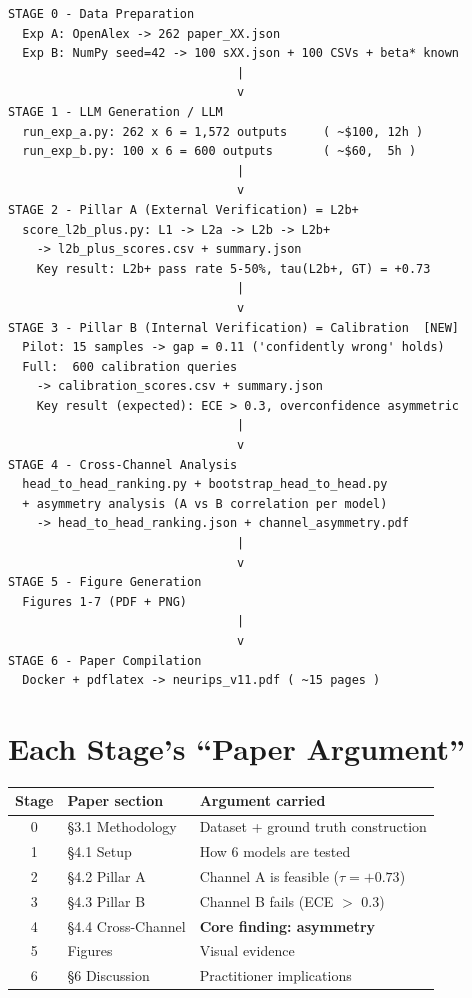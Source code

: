 \documentclass[11pt,a4paper]{article}
\begin{document}
{{{{{{{{{{{{{\begin{tcolorbox}[colback=softgray, colframe=primaryblue, boxrule=0.5pt]
\small
\begin{verbatim}
STAGE 0 - Data Preparation
  Exp A: OpenAlex -> 262 paper_XX.json
  Exp B: NumPy seed=42 -> 100 sXX.json + 100 CSVs + beta* known
                                |
                                v
STAGE 1 - LLM Generation / LLM 
  run_exp_a.py: 262 x 6 = 1,572 outputs     ( ~$100, 12h )
  run_exp_b.py: 100 x 6 = 600 outputs       ( ~$60,  5h )
                                |
                                v
STAGE 2 - Pillar A (External Verification) = L2b+
  score_l2b_plus.py: L1 -> L2a -> L2b -> L2b+
    -> l2b_plus_scores.csv + summary.json
    Key result: L2b+ pass rate 5-50%, tau(L2b+, GT) = +0.73
                                |
                                v
STAGE 3 - Pillar B (Internal Verification) = Calibration  [NEW]
  Pilot: 15 samples -> gap = 0.11 ('confidently wrong' holds)
  Full:  600 calibration queries
    -> calibration_scores.csv + summary.json
    Key result (expected): ECE > 0.3, overconfidence asymmetric
                                |
                                v
STAGE 4 - Cross-Channel Analysis
  head_to_head_ranking.py + bootstrap_head_to_head.py
  + asymmetry analysis (A vs B correlation per model)
    -> head_to_head_ranking.json + channel_asymmetry.pdf
                                |
                                v
STAGE 5 - Figure Generation
  Figures 1-7 (PDF + PNG)
                                |
                                v
STAGE 6 - Paper Compilation
  Docker + pdflatex -> neurips_v11.pdf ( ~15 pages )
\end{verbatim}
\end{tcolorbox}

\section{Each Stage's ``Paper Argument''}

\begin{center}
\begin{tabular}{|c|l|l|}
\hline
\textbf{Stage} & \textbf{Paper section} & \textbf{Argument carried} \\
\hline
0 & \S3.1 Methodology     & Dataset + ground truth construction \\
1 & \S4.1 Setup           & How 6 models are tested \\
2 & \S4.2 Pillar A        & Channel A is feasible ($\tau = +0.73$) \\
3 & \S4.3 Pillar B        & Channel B fails (ECE $>$ 0.3) \\
4 & \S4.4 Cross-Channel   & \textbf{Core finding: asymmetry} \\
5 & Figures               & Visual evidence \\
6 & \S6 Discussion        & Practitioner implications \\
\hline
\end{tabular}
\end{center}

}}}}}}}}}}}}}
\end{document}
